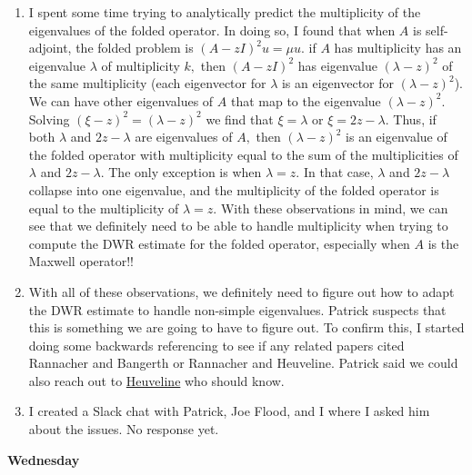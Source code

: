 \documentclass[12pt,a4paper]{article}
\begin{document}
\begin{enumerate}
    \item I spent some time trying to analytically predict the multiplicity of the eigenvalues of the folded operator. In doing so, I found that when $A$ is self-adjoint, the folded problem is $(A-zI)^2u = \mu u.$ if $A$ has multiplicity has an eigenvalue $\lambda$ of multiplicity $k,$ then $(A-zI)^2$ has eigenvalue $(\lambda - z)^2$ of the same multiplicity (each eigenvector for $\lambda$ is an eigenvector for $(\lambda - z)^2$). We can have other eigenvalues of $A$ that map to the eigenvalue $(\lambda - z)^2.$ Solving $(\xi - z)^2 = (\lambda - z)^2$ we find that $\xi = \lambda$ or $\xi = 2z-\lambda.$ Thus, if both $\lambda$ and $2z-\lambda$ are eigenvalues of $A,$ then $(\lambda - z)^2$ is an eigenvalue of the folded operator with multiplicity equal to the sum of the multiplicities of $\lambda$ and $2z-\lambda.$ The only exception is when $\lambda = z.$ In that case, $\lambda$ and $2z-\lambda$ collapse into one eigenvalue, and the multiplicity of the folded operator is equal to the multiplicity of $\lambda =z.$ With these observations in mind, we can see that we definitely need to be able to handle multiplicity when trying to compute the DWR estimate for the folded operator, especially when $A$ is the Maxwell operator!!

    \item With all of these observations, we definitely need to figure out how to adapt the DWR estimate to handle non-simple eigenvalues. Patrick suspects that this is something we are going to have to figure out. To confirm this, I started doing some backwards referencing to see if any related papers cited Rannacher and Bangerth or Rannacher and Heuveline. Patrick said we could also reach out to \href{https://emcl.iwr.uni-heidelberg.de/}{Heuveline} who should know.

    \item I created a Slack chat with Patrick, Joe Flood, and I where I asked him about the issues. No response yet.


\end{enumerate}

\textbf{Wednesday}
\end{document}
